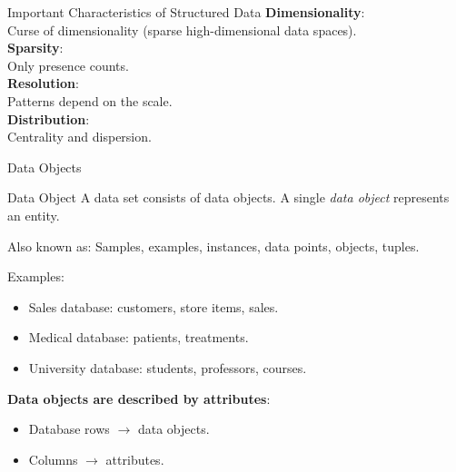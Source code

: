\begin{frame}{Important Characteristics of Structured Data}
	\textbf{Dimensionality}:\\
	Curse of dimensionality (sparse high-dimensional data spaces).\\[0.2cm]

	\textbf{Sparsity}:\\
	Only presence counts.\\[0.2cm]

	\textbf{Resolution}:\\
	Patterns depend on the scale.\\[0.2cm]

	\textbf{Distribution}:\\
	Centrality and dispersion.
\end{frame}

\begin{frame}{Data Objects}
	\begin{block}{Data Object}
		A data set consists of data objects. A single \textit{data object} represents an entity.
	\end{block}

	Also known as: Samples, examples, instances, data points, objects, tuples.\\\medskip

	Examples:
	\begin{itemize}
		\item Sales database: customers, store items, sales.
		\item Medical database: patients, treatments.
		\item University database: students, professors, courses.
	\end{itemize}

	\textbf{Data objects are described by attributes}:
	\begin{itemize}
		\item Database rows $\rightarrow$ data objects.
		\item Columns $\rightarrow$ attributes.
	\end{itemize}
\end{frame}


